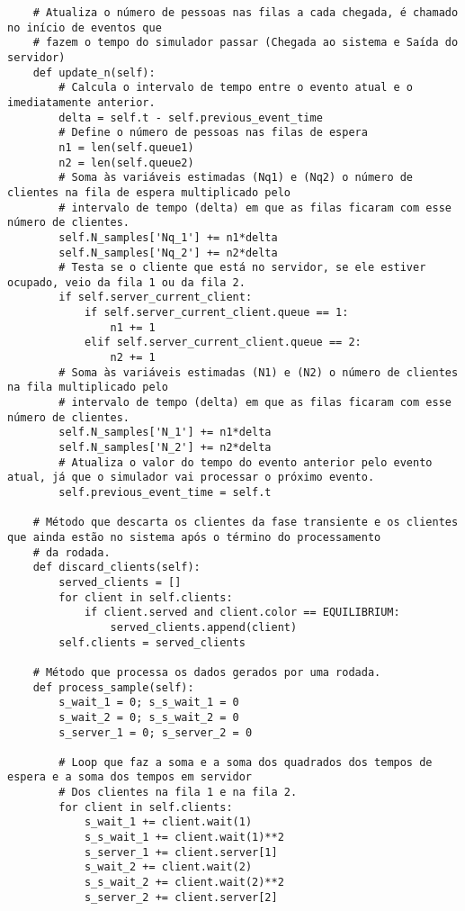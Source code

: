 \begin{verbatim}
    # Atualiza o número de pessoas nas filas a cada chegada, é chamado no início de eventos que
    # fazem o tempo do simulador passar (Chegada ao sistema e Saída do servidor)
    def update_n(self):
        # Calcula o intervalo de tempo entre o evento atual e o imediatamente anterior.
        delta = self.t - self.previous_event_time
        # Define o número de pessoas nas filas de espera
        n1 = len(self.queue1)
        n2 = len(self.queue2)
        # Soma às variáveis estimadas (Nq1) e (Nq2) o número de clientes na fila de espera multiplicado pelo
        # intervalo de tempo (delta) em que as filas ficaram com esse número de clientes.
        self.N_samples['Nq_1'] += n1*delta
        self.N_samples['Nq_2'] += n2*delta
        # Testa se o cliente que está no servidor, se ele estiver ocupado, veio da fila 1 ou da fila 2.
        if self.server_current_client:
            if self.server_current_client.queue == 1:
                n1 += 1
            elif self.server_current_client.queue == 2:
                n2 += 1
        # Soma às variáveis estimadas (N1) e (N2) o número de clientes na fila multiplicado pelo
        # intervalo de tempo (delta) em que as filas ficaram com esse número de clientes.
        self.N_samples['N_1'] += n1*delta
        self.N_samples['N_2'] += n2*delta
        # Atualiza o valor do tempo do evento anterior pelo evento atual, já que o simulador vai processar o próximo evento.
        self.previous_event_time = self.t

    # Método que descarta os clientes da fase transiente e os clientes que ainda estão no sistema após o término do processamento
    # da rodada.
    def discard_clients(self):
        served_clients = []
        for client in self.clients:
            if client.served and client.color == EQUILIBRIUM:
                served_clients.append(client)
        self.clients = served_clients

    # Método que processa os dados gerados por uma rodada.
    def process_sample(self):
        s_wait_1 = 0; s_s_wait_1 = 0
        s_wait_2 = 0; s_s_wait_2 = 0
        s_server_1 = 0; s_server_2 = 0

        # Loop que faz a soma e a soma dos quadrados dos tempos de espera e a soma dos tempos em servidor
        # Dos clientes na fila 1 e na fila 2.
        for client in self.clients:
            s_wait_1 += client.wait(1)
            s_s_wait_1 += client.wait(1)**2
            s_server_1 += client.server[1]
            s_wait_2 += client.wait(2)
            s_s_wait_2 += client.wait(2)**2
            s_server_2 += client.server[2]
            

\end{verbatim}
